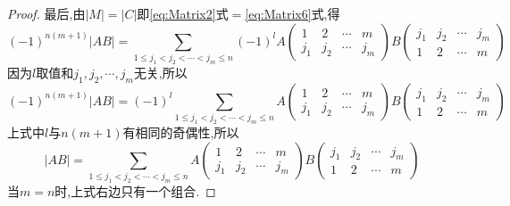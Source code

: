 \begin{proof}
  最后,由$|M|=|C|$即\eqref{eq:Matrix2}式$=$\eqref{eq:Matrix6}式,得
  \begin{equation*}
    (-1)^{n(m+1)}|AB|=\sum\limits_{1\le j_1<j_2<\cdots<j_m\le n}
  (-1)^{l}
  A\left(\begin{smallmatrix}
      1 & 2 & \cdots & m \\
      j_1 & j_2 & \cdots & j_m \end{smallmatrix}\right)
  B\left(\begin{smallmatrix}
      j_1 & j_2 & \cdots & j_m\\
      1 & 2 & \cdots & m \end{smallmatrix}\right)
\end{equation*}
因为$l$取值和$j_1 , j_2 , \cdots , j_m$无关,所以
  \begin{equation*}
    (-1)^{n(m+1)}|AB| =(-1)^{l}\sum\limits_{1\le j_1<j_2<\cdots<j_m\le n}
  A\left(\begin{smallmatrix}
      1 & 2 & \cdots & m \\
      j_1 & j_2 & \cdots & j_m \end{smallmatrix}\right)
  B\left(\begin{smallmatrix}
      j_1 & j_2 & \cdots & j_m\\
      1 & 2 & \cdots & m \end{smallmatrix}\right)
  \end{equation*}
  上式中$l$与$n(m+1)$有相同的奇偶性,所以
  \[
    |AB|=\sum\limits_{1\le j_1<j_2<\cdots<j_m\le n}
  A\left(\begin{smallmatrix}
      1 & 2 & \cdots & m \\
      j_1 & j_2 & \cdots & j_m \end{smallmatrix}\right)
  B\left(\begin{smallmatrix}
      j_1 & j_2 & \cdots & j_m\\
      1 & 2 & \cdots & m \end{smallmatrix}\right)
\]
当$m=n$时,上式右边只有一个组合.
\end{proof}

